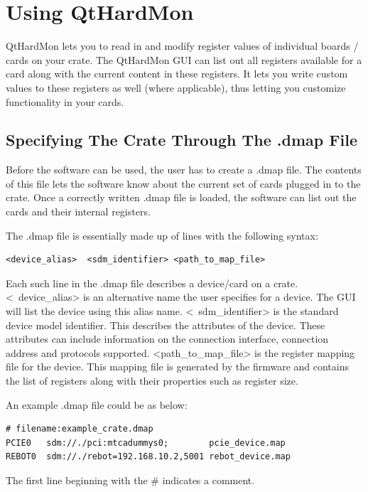 \chapter{Using QtHardMon}

QtHardMon lets you to read in and modify register values of individual boards /
cards on your crate. The QtHardMon GUI can list out all registers available for
a card along with the current content in these registers. It lets you write
custom values to these registers as well (where applicable), thus letting you
customize functionality in your cards.

\section{Specifying The Crate Through The .dmap File} Before the software can be
used, the user has to create a .dmap file. The contents of this file lets the
software know about the current set of cards plugged in to the crate. Once a
correctly written .dmap file is loaded, the software can list out the cards and
their internal registers. 

The .dmap file is essentially made up of lines with the following syntax:
\begin{lstlisting} 
<device_alias>  <sdm_identifier> <path_to_map_file> 
\end{lstlisting}

Each such line in the .dmap file describes a device/card on a crate.  \mbox{\textless
device\_alias\textgreater}  is an alternative name the user specifies for a
device. The GUI will list the device using this alias name.  \mbox{\textless
sdm\_identifier\textgreater} is the standard device model identifier. This describes the 
attributes of the device. These attributes can include information on 
the connection interface, connection address and protocols supported.
\mbox{\textless path\_to\_map\_file\textgreater} is the
register mapping file for the device. This mapping file is generated by the
firmware and contains the list of registers along with their properties such as
register size.
	

An example .dmap file could be as below: 
{\ttfamily  
\begin{lstlisting} 
# filename:example_crate.dmap 
PCIE0   sdm://./pci:mtcadummys0;        pcie_device.map
REBOT0  sdm://./rebot=192.168.10.2,5001 rebot_device.map
\end{lstlisting}
}


The first line beginning with the \# indicates a comment. 

